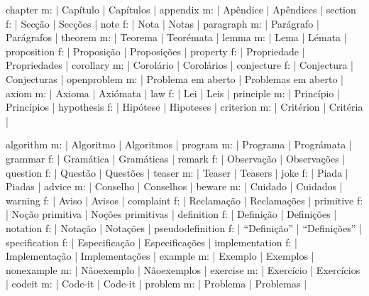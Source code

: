 \DefNoun  chapter           m: | Capítulo              | Capítulos               |
\DefNoun  appendix          m: | Apêndice              | Apêndices               |
\DefNoun  section           f: | Secção                | Secções                 |
\DefNoun  note              f: | Nota                  | Notas                   |
\DefNoun  paragraph         m: | Parágrafo             | Parágrafos              |
\DefNoun  theorem           m: | Teorema               | Teorémata               |
\DefNoun  lemma             m: | Lema                  | Lémata                  |
\DefNoun  proposition       f: | Proposição            | Proposições             |
\DefNoun  property          f: | Propriedade           | Propriedades            |
\DefNoun  corollary         m: | Corolário             | Corolários              |
\DefNoun  conjecture        f: | Conjectura            | Conjecturas             |
\DefNoun  openproblem       m: | {Problema em aberto}  | {Problemas em aberto}   |
\DefNoun  axiom             m: | Axioma                | Axiómata                |
\DefNoun  law               f: | Lei                   | Leis                    |
\DefNoun  principle         m: | Princípio             | Princípios              |
\DefNoun  hypothesis        f: | Hipótese              | Hipoteses               |
\DefNoun  criterion         m: | Critérion             | Critéria                |

\DefNoun  algorithm         m: | Algoritmo             | Algoritmos              |
\DefNoun  program           m: | Programa              | Prográmata              |
\DefNoun  grammar           f: | Gramática             | Gramáticas              |
\DefNoun  remark            f: | Observação            | Observações             |
\DefNoun  question          f: | Questão               | Questões                |
\DefNoun  teaser            m: | Teaser                | Teasers                 |
\DefNoun  joke              f: | Piada                 | Piadas                  |
\DefNoun  advice            m: | Conselho              | Conselhos               |
\DefNoun  beware            m: | Cuidado               | Cuidados                |
\DefNoun  warning           f: | Aviso                 | Avisos                  |
\DefNoun  complaint         f: | Reclamação            | Reclamações             |
\DefNoun  primitive         f: | {Noção primitiva}     | {Noções primitivas}     |
\DefNoun  definition        f: | Definição             | Definições              |
\DefNoun  notation          f: | Notação               | Notações                |
\DefNoun  pseudodefinition  f: | ``Definição''         | ``Definições''          |
\DefNoun  specification     f: | Especificação         | Especificações          |
\DefNoun  implementation    f: | Implementação         | Implementações          |
\DefNoun  example           m: | Exemplo               | Exemplos                |
\DefNoun  nonexample        m: | Nãoexemplo            | Nãoexemplos             |
\DefNoun  exercise          m: | Exercício             | Exercícios              |
\DefNoun  codeit            m: | Code-it               | Code-it                 |
\DefNoun  problem           m: | Problema              | Problemas               |

